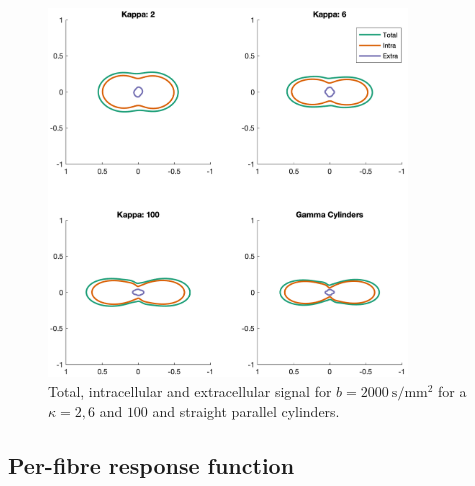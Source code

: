 \begin{figure}
  \centering
  \includegraphics[width=0.85\textwidth]{figures/frf_experiment/sig_sh_b2000}
  \caption[Extracellular signal fraction as a function of b-value]{Total, intracellular and extracellular signal for $b = \SI{2000}{\second\per\milli\metre\squared}$ for a $\kappa = 2, 6$ and $100$ and straight parallel cylinders. }
  \label{fig:frf_extra_frac}
\end{figure}

\subsection{Per-fibre response function}
\label{sec:frf_res_per_fibre}


